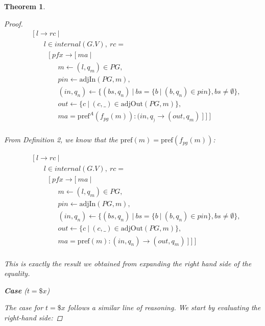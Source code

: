 \documentclass[twocolumn, openany]{sig-alternate-10pt}
\newcommand{\Pref}{\ensuremath{\mathrm{pref}}}
\newtheorem{thm}{Theorem}
\begin{document}
\begin{thm}
\begin{proof}
    \[ \begin{array}{l}
     ~~~~~ [~ l \rightarrow rc ~\vert~ \\
     ~~~~~~~~~~~~ l \in internal(G.V), ~rc =  \\
     ~~~~~~~~~~~~~~~ [~ pfx \rightarrow [~ ma ~\vert~ \\
     ~~~~~~~~~~~~~~~~~~~~~ m \leftarrow (l,q_m) \in PG, \\
     ~~~~~~~~~~~~~~~~~~~~~ pin \leftarrow \text{adjIn}(PG,m), \\
     ~~~~~~~~~~~~~~~~~~~~~ (in,q_n) \leftarrow \{ (bs,q_n) ~\vert~ bs=\{b ~\vert~ (b,q_n) \in pin \}, bs \neq \emptyset \}, \\
     ~~~~~~~~~~~~~~~~~~~~~ out \leftarrow \{ c ~\vert~ (c,\_) \in \text{adjOut}(PG,m) \}, \\
     ~~~~~~~~~~~~~~~~~~~~~ ma = \Pref^A(f_{pg}(m)) : (in,q_) \rightarrow (out,q_m) ~] ~] ~]\\
  \end{array} \]%

  From Definition 2, we know that the $\Pref(m) = \Pref(f_{pg}(m))$:

    \[ \begin{array}{l}
     ~~~~~ [~ l \rightarrow rc ~\vert~ \\
     ~~~~~~~~~~~~ l \in internal(G.V), ~rc =  \\
     ~~~~~~~~~~~~~~~ [~ pfx \rightarrow [~ ma ~\vert~ \\
     ~~~~~~~~~~~~~~~~~~~~~ m \leftarrow (l,q_m) \in PG, \\
     ~~~~~~~~~~~~~~~~~~~~~ pin \leftarrow \text{adjIn}(PG,m), \\
     ~~~~~~~~~~~~~~~~~~~~~ (in,q_n) \leftarrow \{ (bs,q_n) ~\vert~ bs=\{b ~\vert~ (b,q_n) \in pin \}, bs \neq \emptyset \}, \\
     ~~~~~~~~~~~~~~~~~~~~~ out \leftarrow \{ c ~\vert~ (c,\_) \in \text{adjOut}(PG,m) \}, \\
     ~~~~~~~~~~~~~~~~~~~~~ ma = \Pref(m) : (in,q_n) \rightarrow (out,q_m) ~] ~] ~]\\
  \end{array} \]%

  This is exactly the result we obtained from expanding the right hand side of the equality.

  \vspace{.4em}
  \noindent
  \textbf{Case} ($t = \$x$)
  \vspace{.4em}

    \noindent
    The case for $t = \$x$ follows a similar line of reasoning. We start by evaluating the right-hand side:


\end{proof}
\end{thm}
\end{document}
